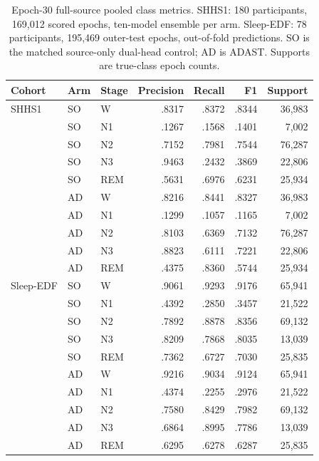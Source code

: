 \documentclass[10pt,a4paper]{article}
\begin{document}
\begin{table}[H]
\centering\small
\renewcommand{\arraystretch}{1.0}
\caption{Epoch-30 full-source pooled class metrics. SHHS1: 180 participants,
169,012 scored epochs, ten-model ensemble per arm. Sleep-EDF: 78 participants,
195,469 outer-test epochs, out-of-fold predictions. SO is the matched source-only
dual-head control; AD is ADAST. Supports are true-class epoch counts.}
\label{tab:sup_adast_fullsource_classes}
\begin{tabular}{lllrrrr}
\toprule
Cohort & Arm & Stage & Precision & Recall & F1 & Support \\
\midrule
SHHS1 & SO & W & .8317 & .8372 & .8344 & 36,983 \\
 & SO & N1 & .1267 & .1568 & .1401 & 7,002 \\
 & SO & N2 & .7152 & .7981 & .7544 & 76,287 \\
 & SO & N3 & .9463 & .2432 & .3869 & 22,806 \\
 & SO & REM & .5631 & .6976 & .6231 & 25,934 \\
 & AD & W & .8216 & .8441 & .8327 & 36,983 \\
 & AD & N1 & .1299 & .1057 & .1165 & 7,002 \\
 & AD & N2 & .8103 & .6369 & .7132 & 76,287 \\
 & AD & N3 & .8823 & .6111 & .7221 & 22,806 \\
 & AD & REM & .4375 & .8360 & .5744 & 25,934 \\
\midrule
Sleep-EDF & SO & W & .9061 & .9293 & .9176 & 65,941 \\
 & SO & N1 & .4392 & .2850 & .3457 & 21,522 \\
 & SO & N2 & .7892 & .8878 & .8356 & 69,132 \\
 & SO & N3 & .8209 & .7868 & .8035 & 13,039 \\
 & SO & REM & .7362 & .6727 & .7030 & 25,835 \\
 & AD & W & .9216 & .9034 & .9124 & 65,941 \\
 & AD & N1 & .4374 & .2255 & .2976 & 21,522 \\
 & AD & N2 & .7580 & .8429 & .7982 & 69,132 \\
 & AD & N3 & .6864 & .8995 & .7786 & 13,039 \\
 & AD & REM & .6295 & .6278 & .6287 & 25,835 \\
\bottomrule
\end{tabular}
\end{table}
\end{document}
